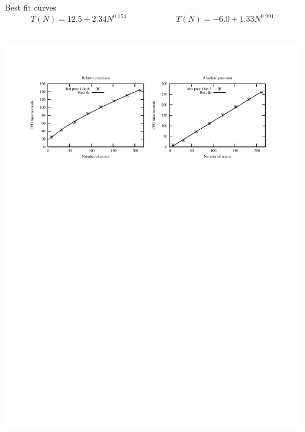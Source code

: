 \documentclass[mathserif]{beamer}
\begin{document}
\begin{frame}
    Best fit curves
    \begin{equation}
	\nonumber
	T(N) = 12.5 + 2.34N^{0.754} \qquad \qquad \qquad T(N) = -6.0 + 1.33N^{0.991}
    \end{equation}
    \ \\
    \begin{center}
	\includegraphics[scale=0.6, clip, viewport = 50 550 540 730]{figures/linearScaling.pdf}
    \end{center}
\end{frame}
\end{document}
